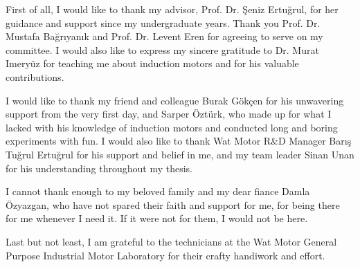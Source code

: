 \vspace*{-6pt}

First of all, I would like to thank my advisor, Prof. Dr. Şeniz Ertuğrul, for her guidance and support since my undergraduate years. Thank you Prof. Dr. Mustafa Bağrıyanık and Prof. Dr. Levent Eren for agreeing to serve on my committee. I would also like to express my sincere gratitude to Dr. Murat Imeryüz for teaching me about induction motors and for his valuable contributions.

I would like to thank my friend and colleague Burak Gökçen for his unwavering support from the very first day, and Sarper Öztürk, who made up for what I lacked with his knowledge of induction motors and conducted long and boring experiments with fun. I would also like to thank Wat Motor R\&D Manager Barış Tuğrul Ertuğrul for his support and belief in me, and my team leader Sinan Unan for his understanding throughout my thesis.

I cannot thank enough to my beloved family and my dear fiance Damla Özyazgan, who have not spared their faith and support for me, for being there for me whenever I need it. If it were not for them, I would not be here.

Last but not least, I am grateful to the technicians at the Wat Motor General Purpose Industrial Motor Laboratory for their crafty handiwork and effort.